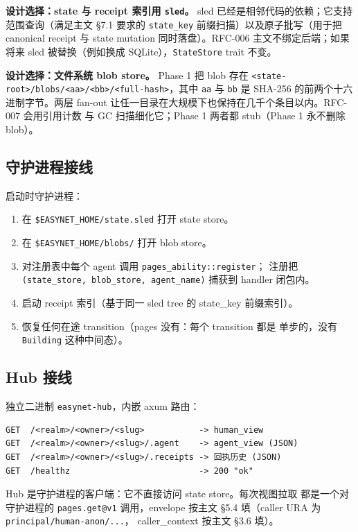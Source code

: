 \documentclass[11pt,a4paper]{article}
\theoremstyle{definition}
\begin{document}
\textbf{设计选择：state 与 receipt 索引用 \texttt{sled}。} sled
已经是相邻代码的依赖；它支持范围查询（满足主文 \S7.1 要求的
\texttt{state\_key} 前缀扫描）以及原子批写（用于把 canonical receipt
与 state mutation 同时落盘）。RFC-006 主文不绑定后端；如果将来 sled
被替换（例如换成 SQLite），\texttt{StateStore} trait 不变。

\textbf{设计选择：文件系统 blob store。} Phase 1 把 blob 存在
\texttt{<state-root>/blobs/<aa>/<bb>/<full-hash>}，其中 \texttt{aa}
与 \texttt{bb} 是 SHA-256 的前两个十六进制字节。两层 fan-out
让任一目录在大规模下也保持在几千个条目以内。RFC-007 会用引用计数
与 GC 扫描细化它；Phase 1 两者都 stub（Phase 1 永不删除 blob）。

\subsection{守护进程接线}

启动时守护进程：

\begin{enumerate}[leftmargin=2.2em,itemsep=0.2em]
    \item 在 \texttt{\$EASYNET\_HOME/state.sled} 打开 state store。
    \item 在 \texttt{\$EASYNET\_HOME/blobs/} 打开 blob store。
    \item 对注册表中每个 agent 调用 \texttt{pages\_ability::register}；
    注册把 \texttt{(state\_store, blob\_store, agent\_name)} 捕获到
    handler 闭包内。
    \item 启动 receipt 索引（基于同一 sled tree 的 state\_key 前缀索引）。
    \item 恢复任何在途 transition（pages 没有：每个 transition 都是
    单步的，没有 \texttt{Building} 这种中间态）。
\end{enumerate}

\subsection{Hub 接线}

独立二进制 \texttt{easynet-hub}，内嵌 axum 路由：

\begin{lstlisting}
GET  /<realm>/<owner>/<slug>           -> human_view
GET  /<realm>/<owner>/<slug>/.agent    -> agent_view (JSON)
GET  /<realm>/<owner>/<slug>/.receipts -> 回执历史 (JSON)
GET  /healthz                          -> 200 "ok"
\end{lstlisting}

Hub 是守护进程的客户端：它不直接访问 state store。每次视图拉取
都是一个对守护进程的 \texttt{pages.get@v1} 调用，envelope 按主文
\S5.4 填（caller URA 为 \texttt{principal/human-anon/...}，
caller\_context 按主文 \S3.6 填）。
\end{document}
